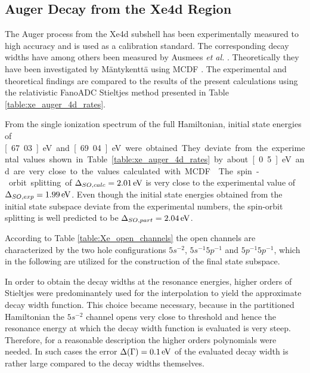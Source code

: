 \subsection{Auger Decay from the Xe4d Region}

The Auger process from the Xe4d subshell has been experimentally
measured to high accuracy \cite{Carroll02} and is used as a calibration standard.
The corresponding decay widths have among others been measured by Ausmees
\textit{et al.} \cite{Ausmees99,Aksela94}.
Theoretically they have been investigated by Mäntykenttä \cite{Maentykenttae93}
using \ac{MCDF} \cite{Fritzsche11}. 
The experimental and theoretical findings are compared to 
the results of the present calculations using the relativistic FanoADC Stieltjes
method presented in Table \ref{table:xe_auger_4d_rates}.

From the single ionization spectrum of the full Hamiltonian, initial state
energies of \unit[67.03]{eV} and \unit[69.04]{eV} were obtained. They deviate
from the experimental values shown in Table \ref{table:xe_auger_4d_rates}
by about \unit[0.5]{eV} and are very close to the values calculated with
\ac{MCDF} \cite{Fritzsche11}. The spin-orbit splitting of
$\Delta_{SO,calc}=\unit[2.01]{eV}$ is very close to the experimental value
of $\Delta_{SO,exp}=\unit[1.99]{eV}$. Even though the initial state energies 
obtained from the initial state subspace
deviate from the experimental numbers, the spin-orbit
splitting is well predicted to be $\Delta_{SO,part}=\unit[2.04]{eV}$.

According to Table \ref{table:Xe_open_channels} the open channels are characterized
by the two hole configurations $5s^{-2}$, $5s^{-1}5p^{-1}$
and $5p^{-1}5p^{-1}$, which in the following are utilized for the construction
of the final state subspace.

In order to obtain the decay widths at the resonance energies,
higher orders of Stieltjes were predominantely
used for the interpolation to yield the approximate decay width function.
This choice became necessary, because in the partitioned
Hamiltonian the $5s^{-2}$ channel
opens very close to threshold and hence the resonance energy at which the decay width
function is evaluated is very steep. Therefore, for a reasonable description
the higher orders polynomials were needed. In such cases the
error $\Delta(\Gamma)=\unit[0.1]{eV}$ of the evaluated
decay width is rather
large compared to the decay widths themselves.

